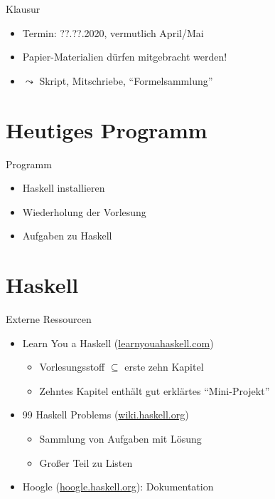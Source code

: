\documentclass{beamer}
\begin{document}
\begin{frame}{Klausur}
	\begin{itemize}
		\item Termin: ??.??.2020, vermutlich April/Mai
		\item Papier-Materialien dürfen mitgebracht werden!
		\item $\leadsto$ Skript, Mitschriebe, \enquote{Formelsammlung}
	\end{itemize}
\end{frame}

\section{Heutiges Programm}
\begin{frame}{Programm}
	\begin{itemize}
		\item Haskell installieren
		\item Wiederholung der Vorlesung
		\item Aufgaben zu Haskell
	\end{itemize}
\end{frame}


\section{Haskell}

\begin{frame}{Externe Ressourcen}
  \begin{itemize}
    \item Learn You a Haskell (\href{http://learnyouahaskell.com}{learnyouahaskell.com})
    \begin{itemize}
      \item Vorlesungsstoff $\subseteq$ erste zehn Kapitel
      \item Zehntes Kapitel enthält gut erklärtes \enquote{Mini-Projekt}
    \end{itemize}
    \item 99 Haskell Problems (\href{https://wiki.haskell.org/H-99:_Ninety-Nine_Haskell_Problems}{wiki.haskell.org})
    \begin{itemize}
      \item Sammlung von Aufgaben mit Lösung
      \item Großer Teil zu Listen
    \end{itemize}
    \item Hoogle (\href{https://hoogle.haskell.org}{hoogle.haskell.org}): Dokumentation
  \end{itemize}
\end{frame}
\end{document}
